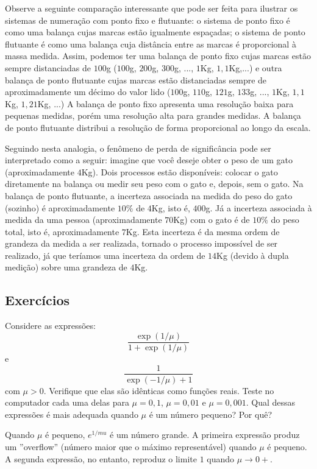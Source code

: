 \begin{ex} Observe a seguinte comparação interessante que pode ser feita para ilustrar os sistemas de numeração com ponto fixo e flutuante: o sistema de ponto fixo é como uma balança cujas marcas estão igualmente espaçadas; o sistema de ponto flutuante é como uma balança cuja distância entre as marcas é proporcional à massa medida. Assim, podemos ter uma balança de ponto fixo cujas marcas estão sempre distanciadas de $100$g ($100$g, $200$g, $300$g, ..., $1$Kg, $1,1$Kg,...) e outra balança de ponto flutuante cujas marcas estão distanciadas sempre de aproximadamente um décimo do valor lido ($100$g, $110$g, $121$g, $133$g, ..., $1$Kg, $1,1$Kg, $1,21$Kg, ...) A balança de ponto fixo apresenta uma resolução baixa para pequenas medidas, porém uma resolução alta para grandes medidas. A balança de ponto flutuante distribui a resolução de forma proporcional ao longo da escala.    

Seguindo nesta analogia, o fenômeno de perda de significância pode ser interpretado como a seguir: imagine que você deseje obter o peso de um gato (aproximadamente $4$Kg). Dois processos estão disponíveis: colocar o gato diretamente na balança ou medir seu peso com o gato e, depois, sem o gato. Na balança de ponto flutuante, a incerteza associada na medida do peso do gato (sozinho) é aproximadamente $10\%$ de $4$Kg, isto é, $400$g. Já a incerteza associada à medida da uma pessoa (aproximadamente $70$Kg) com o gato é de $10\%$ do peso total, isto é, aproximadamente $7$Kg. Esta incerteza é da mesma ordem de grandeza da medida a ser realizada, tornado o processo impossível de ser realizado, já que teríamos uma incerteza da ordem de $14$Kg (devido à dupla medição) sobre uma grandeza de $4$Kg.    
\end{ex}

\subsection*{Exercícios}

\begin{exer} Considere as expressões:
  \begin{equation*}
    \frac{\exp(1/\mu)}{1+\exp(1/\mu)}  
  \end{equation*}
e
\begin{equation*}
  \frac{1}{\exp(-1/\mu)+1}
\end{equation*}
com $\mu>0$. Verifique que elas são idênticas como funções reais. Teste no computador cada uma delas para $\mu=0,1$, $\mu=0,01$ e $\mu=0,001$. Qual dessas expressões é mais adequada quando $\mu$ é um número pequeno? Por quê?
\end{exer}
\begin{resp}
  
  Quando $\mu$ é pequeno, $e^{1/mu}$ é um número grande. A primeira expressão produz um ''overflow'' (número maior que o máximo representável) quando $\mu$ é pequeno. A segunda expressão, no entanto, reproduz o limite $1$ quando $\mu\to 0+$.
  
\end{resp}

